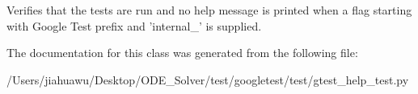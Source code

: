 \begin{DoxyVerb}Verifies that the tests are run and no help message is printed when
a flag starting with Google Test prefix and 'internal_' is supplied.\end{DoxyVerb}
 

The documentation for this class was generated from the following file\+:\begin{DoxyCompactItemize}
\item 
/\+Users/jiahuawu/\+Desktop/\+O\+D\+E\+\_\+\+Solver/test/googletest/test/gtest\+\_\+help\+\_\+test.\+py\end{DoxyCompactItemize}
